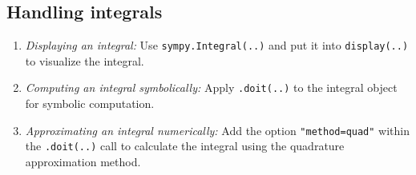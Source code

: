 \subsection{Handling integrals}\label{subsec:handling-integrals}

\begin{enumerate}
    \item \emph{Displaying an integral:}
    Use \texttt{sympy.Integral(..)}
    and put it into \texttt{display(..)} to visualize the integral.
    \item \emph{Computing an integral symbolically:}
    Apply \texttt{.doit(..)} to the integral object for symbolic computation.
    \item \emph{Approximating an integral numerically:}
    Add the option \texttt{"method=quad"} within the \texttt{.doit(..)} call
    to calculate the integral using the quadrature approximation method.
\end{enumerate}